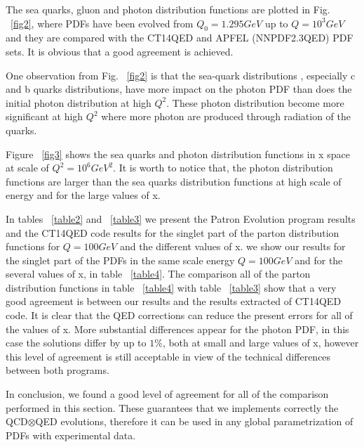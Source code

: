 \documentclass[review]{elsarticle}
\begin{document}
The sea quarks, gluon and photon distribution functions are plotted in Fig. ~\eqref{fig2}, where PDFs have been evolved from $Q_0= 1.295 GeV$ up to $Q=10^{3} GeV$ and they are compared with the CT14QED and APFEL (NNPDF2.3QED) PDF sets. It is obvious that  a good agreement is achieved.

One observation from Fig. ~\eqref{fig2} is that the sea-quark distributions , especially c and b quarks distributions,  have more impact on the photon PDF than does the initial photon distribution at high $Q^2$. These photon distribution become more significant at high $Q^2$ where more photon are produced through radiation of the quarks.

Figure ~\eqref{fig3} shows the sea quarks and photon
distribution functions in x space at scale of $Q^{2}=10^{6}GeV^{2}$.
It is worth to notice that, the photon distribution functions are
larger than the sea quarks distribution functions at high scale of
energy and for the large values of x.

In tables ~\eqref{table2} and ~\eqref{table3} we present the Patron Evolution program \cite{Roth:2004ti} results and the CT14QED code \cite{Schmidt:2015zda} results for the singlet part of the parton distribution functions for $Q=100 GeV$ and the different values of x. we show our results for the singlet part of the PDFs in the same scale energy $Q=100 GeV$ and for the several values of x, in table ~\eqref{table4}. The comparison all of the parton distribution functions in table ~\eqref{table4} with table ~\eqref{table3} show that a very good agreement is between our results and the results extracted of CT14QED code. It is clear that the QED corrections can reduce the present errors for all of the values of x. More substantial differences appear for the photon PDF, in this case the solutions differ by up to $1\%$, both at small and large values of x, however this level of agreement is still acceptable in view of the technical differences between both programs.

In conclusion, we found a good level of agreement for all of the comparison performed in this section. These guarantees that we implements correctly the QCD$\otimes$QED evolutions, therefore it can be used in any global parametrization of PDFs with  experimental data.
\end{document}
